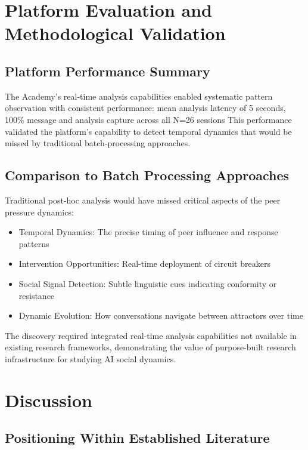 \documentclass[11pt,letterpaper]{article}
\newcommand{\theacademy}{The Academy}
\newcommand{\exponedataTotalSessionsRaw}{26}
\newcommand{\exponedataTotalSessions}{N=\exponedataTotalSessionsRaw}
\newcommand{\platformLatency}{5}
\begin{document}
\section{Platform Evaluation and Methodological Validation}

\subsection{Platform Performance Summary}

\theacademy{}'s real-time analysis capabilities enabled systematic pattern observation with consistent performance: mean analysis latency of \platformLatency{} seconds, 100\% message and analysis capture across all \exponedataTotalSessions{} sessions This performance validated the platform's capability to detect temporal dynamics that would be missed by traditional batch-processing approaches.

\subsection{Comparison to Batch Processing Approaches}

Traditional post-hoc analysis would have missed critical aspects of the peer pressure dynamics:

\begin{itemize}
    \item Temporal Dynamics: The precise timing of peer influence and response patterns
    \item Intervention Opportunities: Real-time deployment of circuit breakers
    \item Social Signal Detection: Subtle linguistic cues indicating conformity or resistance
    \item Dynamic Evolution: How conversations navigate between attractors over time
\end{itemize}

The discovery required integrated real-time analysis capabilities not available in existing research frameworks, demonstrating the value of purpose-built research infrastructure for studying AI social dynamics.

\section{Discussion}

\subsection{Positioning Within Established Literature}
\end{document}
